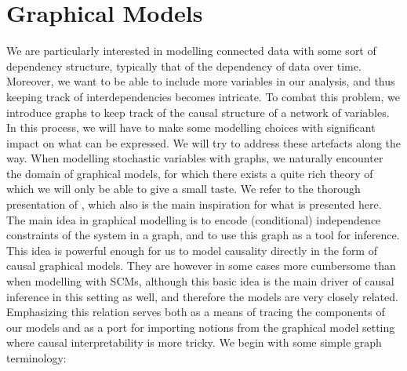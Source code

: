 \documentclass[11pt, a4paper]{memoir}
\theoremstyle{break}
\theoremstyle{break}
\theoremstyle{nonumberplain}
\begin{document}
\section{Graphical Models}\label{graphmod}
We are particularly interested in modelling connected data with some sort of dependency structure, typically that of the dependency of data over time. Moreover, we want to be able to include more variables in our analysis, and thus keeping track of interdependencies becomes intricate. To combat this problem, we introduce graphs to keep track of the causal structure of a network of variables. In this process, we will have to make some modelling choices with significant impact on what can be expressed. We will try to address these artefacts along the way. When modelling stochastic variables with graphs, we naturally encounter the domain of graphical models, for which there exists a quite rich theory of which we will only be able to give a small taste. We refer to the thorough presentation of \cite{Steffen}, which also is the main inspiration for what is presented here. The main idea in graphical modelling is to encode (conditional) independence constraints of the system in a graph, and to use this graph as a tool for inference. This idea is powerful enough for us to model causality directly in the form of causal graphical models. They are however in some cases more cumbersome than when modelling with SCMs, although this basic idea is the main driver of causal inference in this setting as well, and therefore the models are very closely related. Emphasizing this relation serves both as a means of tracing the components of our models and as a port for importing notions from the graphical model setting where causal interpretability is more tricky. We begin with some simple graph terminology:
\end{document}
